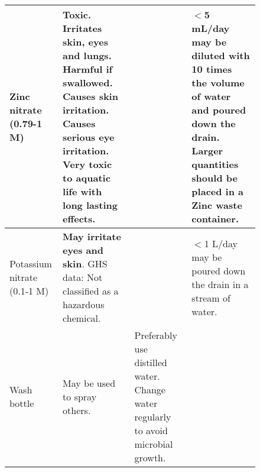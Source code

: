 \documentclass[11pt,a4paper]{article}
\begin{document}
\begin{figure}[]
\begin{tabular}{|p{3cm}|p{4cm}|p{4.5cm}|p{4cm}|}
		\hline
		Zinc nitrate (0.79-1 M) & \textbf{Toxic}. \textbf{Irritates skin, eyes and lungs}. \textbf{Harmful if swallowed}. Causes skin irritation. \textbf{Causes serious eye irritation}. \textbf{Very toxic to aquatic life with long lasting effects}. & & $<$5 mL/day may be diluted with 10 times the volume of water and poured down the drain. Larger quantities should be placed in a Zinc waste container. \\
		\hline
		Potassium nitrate (0.1-1 M) & \textbf{May irritate eyes and skin}. GHS data: Not classified as a hazardous chemical. & & $<$1 L/day may be poured down the drain in a stream of water. \\
		\hline
		Wash bottle & May be used to spray others. & Preferably use distilled water. Change water regularly to avoid microbial growth. & \\
		\hline
	\end{tabular}
\end{figure}
\normalsize
\end{document}
